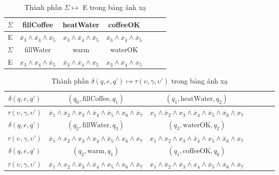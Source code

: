 \documentclass[a4paper,13pt,oneside,openany]{book}
\begin{document}
\begin{flushleft}
	\begin{table}[!ht]
		\centering
		\renewcommand{\arraystretch}{1.25}
		\begin{tabular}{|c|c|c|c|c|c|c|}
			\hline
			$\Sigma$ & fillCoffee & heatWater & coffeeOK\\
			\hline
			E & $\overline{x}_3 \land \overline{x}_4 \land \overline{x}_5$ & $x_3 \land \overline{x}_4 \land \overline{x}_5$ & $\overline{x}_3 \land x_4 \land \overline{x}_5$\\
			\hline
			$\Sigma$ & fillWater & warm & waterOK\\
			\hline
			E &  $x_3 \land x_4 \land \overline{x}_5$ & $\overline{x}_3 \land \overline{x}_4 \land x_5$ & $x_3 \land \overline{x}_4 \land x_5$\\
			\hline
		\end{tabular}
		\caption{Thành phần $\Sigma \mapsto$ E trong bảng ánh xạ}
	\end{table}
	
	\begin{table}[!ht]
		\centering
		\renewcommand{\arraystretch}{1.25}
		\begin{tabular}{|c|c|c|c|c|c|c|}
			\hline
			$\delta(q, e, q\textrm{'})$ & $(q_0, \textrm{fillCoffee}, q_1)$ & $(q_1, \textrm{heatWater}, q_2)$\\
			\hline
			$\tau(\upsilon, \gamma, \upsilon\textrm{'})$ & $\overline{x}_1 \land \overline{x}_2 \land \overline{x}_3 \land \overline{x}_4 \land \overline{x}_5 \land x_6 \land \overline{x}_7$ & $x_1 \land \overline{x}_2 \land x_3 \land \overline{x}_4 \land \overline{x}_5 \land \overline{x}_6 \land x_7$ \\
			\hline
			$\delta(q, e, q\textrm{'})$ & $(q_2, \textrm{fillWater}, q_3) $ & $(q_3, \textrm{waterOK}, q_2)$\\
			\hline
			$\tau(\upsilon, \gamma, \upsilon\textrm{'})$ & $\overline{x}_1 \land x_2 \land x_3 \land x_4 \land \overline{x}_5 \land x_6 \land x_7$ & $x_1 \land x_2 \land x_3 \land \overline{x}_4 \land x_5 \land \overline{x}_6 \land x_7$\\
			\hline
			$\delta(q, e, q\textrm{'})$ & $(q_2, \textrm{warm}, q_1)$ & $(q_1, \textrm{coffeeOK}, q_0) $ \\
			\hline
			$\tau(\upsilon, \gamma, \upsilon\textrm{'})$ & $\overline{x}_1 \land x_2 \land \overline{x}_3 \land \overline{x}_4 \land x_5 \land x_6 \land \overline{x}_7$ & $x_1 \land \overline{x}_2 \land \overline{x}_3 \land x_4 \land \overline{x}_5 \land \overline{x}_6 \land \overline{x}_7 $\\
			\hline
		\end{tabular}
		\caption{Thành phần $\delta(q, e, q\textrm{'}) \mapsto \tau(\upsilon, \gamma, \upsilon\textrm{'})$ trong bảng ánh xạ}
	\end{table}
	

\end{flushleft}
\end{document}
